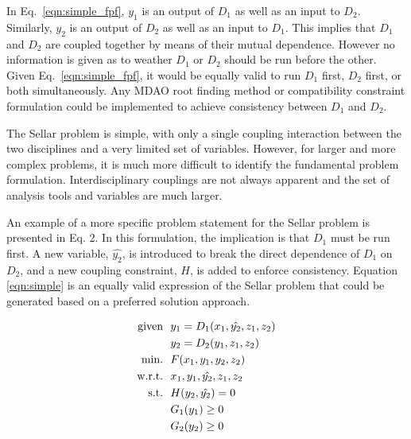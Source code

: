     
    In Eq.~\ref{eqn:simple_fpf}, $y_1$ is an output of $D_1$ as well as an input 
    to $D_2$. Similarly, $y_2$ is an output of $D_2$ as well as an input 
    to $D_1$. This implies that $D_1$ and $D_2$ are coupled together by means 
    of their mutual dependence. However no information is given as to weather
    $D_1$ or $D_2$ should be run before the other. Given Eq.~\ref{eqn:simple_fpf}, 
    it would be equally valid to run $D_1$ first, $D_2$ first, or both simultaneously. 
Any MDAO root finding method or compatibility constraint formulation could be implemented to achieve consistency between $D_1$ and $D_2$.
    
    The Sellar problem is simple, with only a single coupling interaction 
    between the two disciplines and a very limited set of variables. 
 However, for larger and more complex problems, 
    it is much more difficult to identify the fundamental problem formulation. Interdisciplinary 
    couplings are not always apparent and the set of analysis tools and variables are 
    much larger. 

An example of a more specific problem statement for the Sellar problem is presented in Eq. 2.  
In this formulation, the implication is that  $D_1$ must be run 
    first. A new variable, $\hat{y_2}$, is introduced to break the direct dependence of
    $D_1$ on $D_2$, and a new coupling constraint, $H$, is added to enforce 
    consistency. Equation \ref{eqn:simple} is 
    an equally valid expression of the Sellar problem that could be 
    generated  based on a preferred solution approach.

    \begin{align}
        \textrm{given} & \ \ y_1 = D_1(x_1,\hat{y_2},z_1,z_2) \notag
        \\      & \ \ y_2 = D_2(y_1,z_1,z_2) \notag
        \\\textrm{min.} &\ \ F(x_1,y_1,y_2,z_2) \notag
        \\\textrm{w.r.t.} & \ \ x_1,y_1,\hat{y_2},z_1,z_2 \notag
        \\\textrm{s.t.} & \ \ H(y_2,\hat{y_2}) = 0 \notag 
        \\     & \ \ G_1(y_1) \geq 0 \notag
        \\     & \ \ G_2(y_2) \geq 0
        \label{eqn:simple}
    \end{align}


